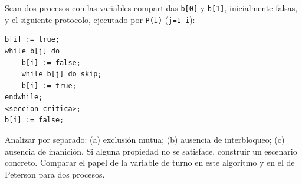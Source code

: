 \begin{ejercicio}
Sean dos procesos con las variables compartidas \texttt{b[0]} y \texttt{b[1]}, inicialmente falsas, y el
siguiente protocolo, ejecutado por \texttt{P(i)} (\texttt{j=1-i}):
\begin{lstlisting}
b[i] := true;
while b[j] do
    b[i] := false;
    while b[j] do skip;
    b[i] := true;
endwhile;
<seccion critica>;
b[i] := false;
\end{lstlisting}
Analizar por separado: (a) exclusión mutua; (b) ausencia de interbloqueo; (c) ausencia de inanición. Si alguna
propiedad no se satisface, construir un escenario concreto. Comparar el papel de la variable de turno en este
algoritmo y en el de Peterson para dos procesos.
\end{ejercicio}
